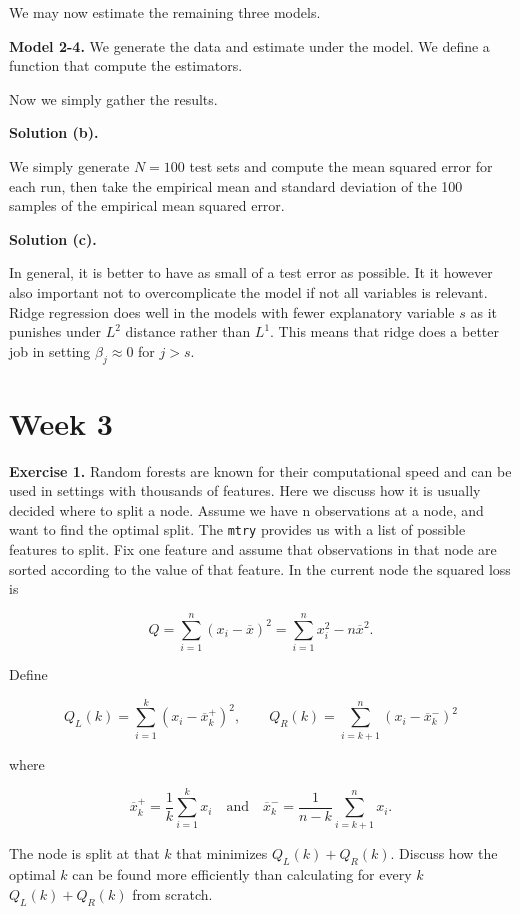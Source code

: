 \documentclass[a4paper,12pt,openany]{book}
\begin{document}
We may now estimate the remaining three models.

\textbf{Model 2-4.} We generate the data and estimate under the model. We define a function that compute the estimators.

Now we simply gather the results.

\textbf{Solution (b).}

We simply generate \(N=100\) test sets and compute the mean squared error for each run, then take the empirical mean and standard deviation of the 100 samples of the empirical mean squared error.

\textbf{Solution (c).}

In general, it is better to have as small of a test error as possible. It it however also important not to overcomplicate the model if not all variables is relevant. Ridge regression does well in the models with fewer explanatory variable \(s\) as it punishes under \(L^2\) distance rather than \(L^1\). This means that ridge does a better job in setting \(\beta_j\approx 0\) for \(j> s\).

\hypertarget{week-3-1}{%
\section{Week 3}\label{week-3-1}}

\textbf{Exercise 1.} Random forests are known for their computational speed and can be used in settings with thousands of features. Here we discuss how it is usually decided where to split a node. Assume we have n observations at a node, and want to find the optimal split. The \texttt{mtry} provides us with a list of possible features to split. Fix one feature and assume that observations in that node are sorted according to the value of that feature. In the current node the squared loss is

\[
Q=\sum_{i=1}^n(x_i-\overline x)^2=\sum_{i=1}^nx_i^2-n\overline{x}^2.
\]

Define

\[
Q_L(k)=\sum_{i=1}^k(x_i-\overline{x}_k^+)^2,\qquad Q_R(k)=\sum_{i=k+1}^n(x_i-\overline{x}_k^-)^2
\]

where

\[
\overline{x}_k^+=\frac{1}{k}\sum_{i=1}^kx_i\quad \text{and}\quad \overline{x}_k^-=\frac{1}{n-k}\sum_{i=k+1}^nx_i.
\]

The node is split at that \(k\) that minimizes \(Q_L(k)+Q_R(k)\). Discuss how the optimal \(k\) can be found more efficiently than calculating for every \(k\) \(Q_L(k)+Q_R(k)\) from scratch.
\end{document}
